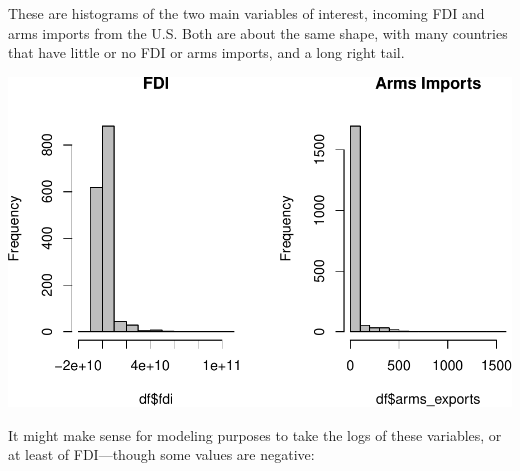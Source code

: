 \documentclass[12pt,]{article}
\newenvironment{Shaded}{\begin{snugshade}}{\end{snugshade}}
\newcommand{\DataTypeTok}[1]{\textcolor[rgb]{0.13,0.29,0.53}{#1}}
\newcommand{\DecValTok}[1]{\textcolor[rgb]{0.00,0.00,0.81}{#1}}
\newcommand{\KeywordTok}[1]{\textcolor[rgb]{0.13,0.29,0.53}{\textbf{#1}}}
\newcommand{\NormalTok}[1]{#1}
\newcommand{\OperatorTok}[1]{\textcolor[rgb]{0.81,0.36,0.00}{\textbf{#1}}}
\newcommand{\StringTok}[1]{\textcolor[rgb]{0.31,0.60,0.02}{#1}}
\begin{document}
These are histograms of the two main variables of interest, incoming FDI
and arms imports from the U.S. Both are about the same shape, with many
countries that have little or no FDI or arms imports, and a long right
tail.

\begin{Shaded}
\end{Shaded}

\includegraphics{proposal_files/figure-latex/unnamed-chunk-13-1.pdf}

It might make sense for modeling purposes to take the logs of these
variables, or at least of FDI---though some values are negative:

\begin{Shaded}
\end{Shaded}
\end{document}
